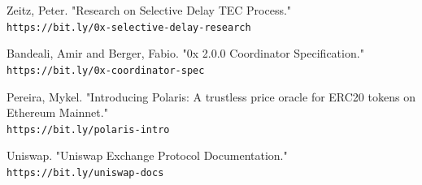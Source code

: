 \documentclass[10pt]{article}
\begin{document}
\begin{thebibliography}{9}
Zeitz, Peter. "Research on Selective Delay TEC Process."
\\\texttt{https://bit.ly/0x-selective-delay-research}

Bandeali, Amir and Berger, Fabio. "0x 2.0.0 Coordinator Specification."
\\\texttt{https://bit.ly/0x-coordinator-spec}

Pereira, Mykel. "Introducing Polaris: A trustless price oracle for ERC20 tokens on Ethereum Mainnet."
\\\texttt{https://bit.ly/polaris-intro}

Uniswap. "Uniswap Exchange Protocol Documentation."
\\\texttt{https://bit.ly/uniswap-docs}

\end{thebibliography}


\end{document}
